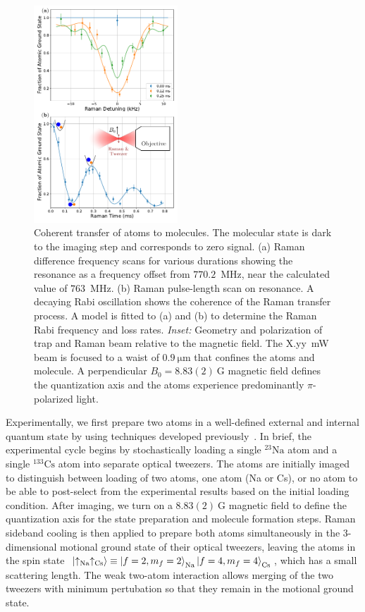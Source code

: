 \documentclass[aps,prl,twocolumn,10pt,superscriptaddress]{revtex4-1}
\newcommand{\Na}{\mathrm{Na}}
\newcommand{\Cs}{\mathrm{Cs}}
\begin{document}
\begin{figure}[ht!]
  \includegraphics[width=0.48\textwidth]{imgs/fig-raman.pdf}
  \caption{Coherent transfer of atoms to molecules.  The molecular state is dark to the imaging step and corresponds to zero signal.
    (a) Raman difference frequency scans for various durations showing the resonance as a frequency offset from $770.2$~MHz, near the calculated value of $763$~MHz.
    (b) Raman pulse-length scan on resonance.
    A decaying Rabi oscillation shows the coherence of
    the Raman transfer process.
    A model is fitted to (a) and (b) to determine
    the Raman Rabi frequency and loss rates.
    \emph{Inset:} Geometry and polarization of trap and Raman beam relative to the magnetic field.
    The X.yy~mW beam is focused to a waist of $0.9~\mathrm{\mu m}$
    that confines the atoms and molecule.
    A perpendicular $B_0=8.83(2)~\mathrm{G}$ magnetic field
    defines the quantization axis and the atoms experience predominantly $\pi$-polarized light.
    \label{f-raman}}
\end{figure}

Experimentally, we first prepare two atoms in a well-defined external and internal quantum state
by using techniques developed previously~\cite{Liu2018, Liu2019, Wang2019}.
In brief, the experimental cycle begins by stochastically loading a single ${}^{23}\Na$ atom
and a single ${}^{133}\Cs$ atom into separate optical tweezers.
The atoms are initially imaged to distinguish between loading of two atoms,
one atom (Na or Cs), or no atom to be able to post-select from the experimental results
based on the initial loading condition.
After imaging, we turn on a $8.83(2)~\mathrm{G}$ magnetic field to define the quantization axis
for the state preparation and molecule formation steps.
Raman sideband cooling is then applied to prepare both atoms simultaneously
in the 3-dimensional motional ground state of their optical tweezers, leaving the atoms in the spin state~$\ket{\uparrow_{\Na}\uparrow_{\Cs}}\equiv \ket{f=2,m_f=2}_{\Na}\ket{f=4,m_f=4}_{\Cs}$,
which has a small scattering length.
The weak two-atom interaction allows merging of the two tweezers with minimum pertubation so that they remain in the motional ground state.
\end{document}
